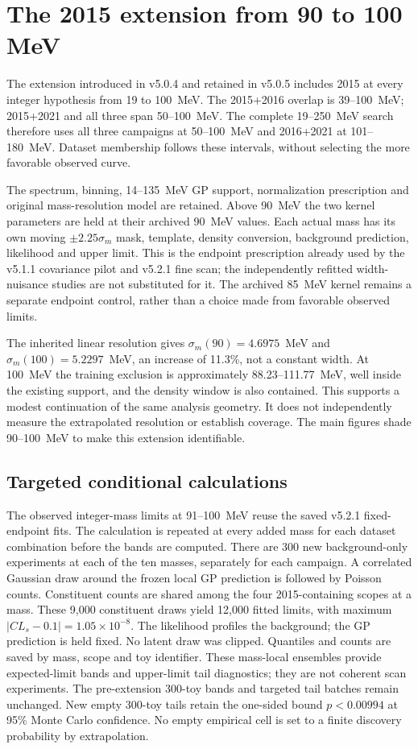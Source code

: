 \section{The 2015 extension from 90 to 100 MeV}
\label{app:v504-extension}
The extension introduced in v5.0.4 and retained in v5.0.5 includes 2015 at every integer hypothesis from 19 to 100~MeV.
The 2015+2016 overlap is 39--100~MeV; 2015+2021 and all three span
50--100~MeV. The complete 19--250~MeV search therefore uses all three
campaigns at 50--100~MeV and 2016+2021 at 101--180~MeV. Dataset membership
follows these intervals, without selecting the more favorable observed curve.

The spectrum, binning, 14--135~MeV GP support, normalization prescription
and original mass-resolution model are retained. Above 90~MeV the two
kernel parameters are held at their archived 90~MeV values. Each actual
mass has its own moving $\pm2.25\sigma_m$ mask, template, density conversion,
background prediction, likelihood and upper limit. This is the endpoint
prescription already used by the v5.1.1 covariance pilot and v5.2.1 fine scan;
the independently refitted width-nuisance studies are not substituted for it.
The archived 85~MeV kernel remains a separate endpoint control, rather than a
choice made from favorable observed limits.

The inherited linear resolution gives $\sigma_m(90)=4.6975$~MeV and
$\sigma_m(100)=5.2297$~MeV, an increase of 11.3\%, not a constant width.
At 100~MeV the training exclusion is approximately 88.23--111.77~MeV,
well inside the existing support, and the density window is also contained.
This supports a modest continuation of the same analysis geometry. It does
not independently measure the extrapolated resolution or establish coverage.
The main figures shade 90--100~MeV to make this extension identifiable.

\subsection{Targeted conditional calculations}
The observed integer-mass limits at 91--100~MeV reuse the saved v5.2.1
fixed-endpoint fits. The calculation is repeated at every added mass for
each dataset combination before the bands are computed. There are 300 new
background-only experiments at each of the ten masses, separately for each
campaign. A correlated Gaussian draw around the frozen local GP prediction
is followed by Poisson counts. Constituent counts are shared among the four
2015-containing scopes at a mass. These 9,000 constituent draws yield
12,000 fitted limits, with maximum $|CL_s-0.1|=1.05\times10^{-8}$.
The likelihood profiles the background; the GP prediction is held fixed.
No latent draw was clipped. Quantiles and counts are saved by mass, scope
and toy identifier. These mass-local ensembles provide expected-limit bands
and upper-limit tail diagnostics; they are not coherent scan experiments.
The pre-extension 300-toy bands and targeted tail batches remain unchanged.
New empty 300-toy tails retain the one-sided bound $p<0.00994$ at 95\%
Monte Carlo confidence. No empty empirical cell is set to a finite discovery
probability by extrapolation.

